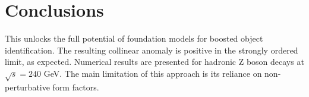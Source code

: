 \section{Conclusions}\label{sec:conclusions}

This unlocks the full potential of foundation models for boosted object
identification. The resulting collinear anomaly is positive in the
strongly ordered limit, as expected. Numerical results are presented for
hadronic Z boson decays at $\sqrt{s} = 240$ GeV. The main limitation of
this approach is its reliance on non-perturbative form factors.

